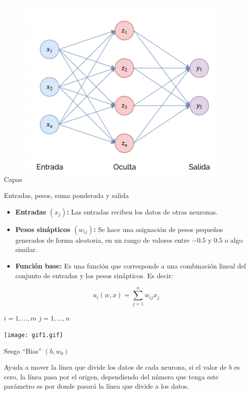 \documentclass[
  ignorenonframetext,
]{beamer}
\begin{document}
\begin{frame}
\begin{block}{Capas}
\includegraphics[width=4.16667in,height=\textheight]{3.png}

\end{block}

\begin{block}{Entradas, pesos, suma ponderada y salida}

\begin{itemize}
\item
  \textbf{Entradas \((x_{j})\):} Las entradas reciben los datos de otras
  neuronas.
\item
  \textbf{Pesos sinápticos \((w_{ij})\):} Se hace una asignación de
  pesos pequeños generados de forma aleatoria, en un rango de valores
  entre \(-0.5\) y \(0.5\) o algo similar.
\item
  \textbf{Función base:} Es una función que corresponde a una
  combinación lineal del conjunto de entradas y los pesos sinápticos. Es
  decir:
\end{itemize}

\[u_{i}(w,x)=\sum_{j=1}^{n}w_{ij}x_{j}\]

\(i=1,...,m\) \(j=1,...,n\)

\texttt{[image: gif1.gif]}

\end{block}

\begin{block}{Sesgo ``Bias'' \((b, w_{0})\)}

Ayuda a mover la línea que divide los datos de cada neurona, si el valor
de \(b\) es cero, la línea pasa por el origen, dependiendo del número
que tenga este parámetro es por donde pasará la línea que divide a los
datos.


\end{block}
\end{frame}
\end{document}
